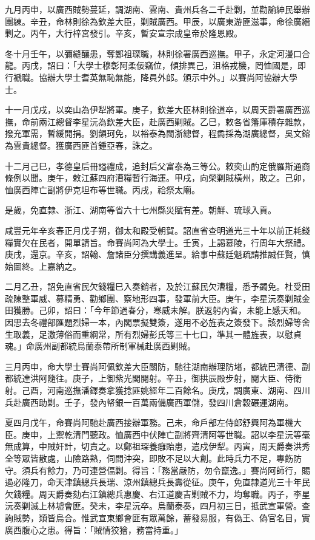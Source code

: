 \begin{pinyinscope}
九月丙申，以廣西賊勢蔓延，調湖南、雲南、貴州兵各二千赴剿，並勸諭紳民舉辦團練。辛丑，命林則徐為欽差大臣，剿賊廣西。甲辰，以廣東游匪滋事，命徐廣縉剿之。丙午，大行梓宮發引。辛亥，暫安宣宗成皇帝於隆恩殿。

冬十月壬午，以彌縫釀患，奪鄭祖琛職，林則徐署廣西巡撫。甲子，永定河漫口合龍。丙戌，詔曰：「大學士穆彰阿柔佞竊位，傾排異己，沮格戎機，罔恤國是，即行褫職。協辦大學士耆英無恥無能，降員外郎。頒示中外。」以賽尚阿協辦大學士。

十一月戊戌，以奕山為伊犁將軍。庚子，欽差大臣林則徐道卒，以周天爵署廣西巡撫，命前兩江總督李星沅為欽差大臣，赴廣西剿賊。乙巳，敕各省籓庫積存雜款，撥充軍需，暫緩開捐。劉韻珂免，以裕泰為閩浙總督，程矞採為湖廣總督，吳文鎔為雲貴總督。獲廣西匪首鍾亞春，誅之。

十二月己巳，孝德皇后冊謚禮成，追封后父富泰為三等公。敕奕山酌定俄羅斯通商條例以聞。庚午，敕江蘇四府漕糧暫行海運。甲戌，向榮剿賊橫州，敗之。己卯，恤廣西陣亡副將伊克坦布等世職。丙戌，祫祭太廟。

是歲，免直隸、浙江、湖南等省六十七州縣災賦有差。朝鮮、琉球入貢。

咸豐元年辛亥春正月戊子朔，御太和殿受朝賀。詔直省查明道光三十年以前正耗錢糧實欠在民者，開單請旨。命賽尚阿為大學士。壬寅，上謁慕陵，行周年大祭禮。庚戌，還京。辛亥，詔翰、詹諸臣分撰講義進呈。給事中蘇廷魁疏請推誠任賢，慎始圖終。上嘉納之。

二月乙丑，詔免直省民欠錢糧巳入奏銷者，及於江蘇民欠漕糧，悉予蠲免。杜受田疏陳整軍威、募精勇、勸鄉團、察地形四事，發軍前大臣。庚午，李星沅奏剿賊金田獲勝。己卯，詔曰：「今年節過春分，寒威未解。朕返躬內省，未能上感天和。因思去冬禮部匯題烈婦一本，內閣票擬雙簽，遂用不必旌表之簽發下。該烈婦等舍生取義，足激薄俗而重綱常，所有烈婦彭氏等三十七口，準其一體旌表，以慰貞魂。」命廣州副都統烏蘭泰帶所制軍械赴廣西剿賊。

三月丙申，命大學士賽尚阿佩欽差大臣關防，馳往湖南辦理防堵，都統巴清德、副都統達洪阿隨往。庚子，上御紫光閣閱射。辛丑，御拱辰殿步射，閱大臣、侍衛射。己酉，河南巡撫潘鐸奏拿獲捻匪姚經年二百餘名。庚戌，調廣東、湖南、四川兵赴廣西助剿。壬子，發內帑銀一百萬兩備廣西軍儲，發四川倉穀碾運湖南。

夏四月戊午，命賽尚阿馳赴廣西接辦軍務。己未，命戶部左侍郎舒興阿為軍機大臣。庚申，上禦乾清門聽政。恤廣西中伏陣亡副將齊清阿等世職。詔以李星沅等毫無成算，中賊奸計，切責之。以鄭祖琛養癰貽患，遣戍伊犁。丙寅，周天爵奏洪秀全等眾皆散處，山險路熟，伺間沖突，即敗不足以大創。此時兵力不足，專飭防守。須兵有餘力，乃可連營偪剿。得旨：「務當嚴防，勿令竄逸。」賽尚阿師行，賜遏必隆刀，命天津鎮總兵長瑞、涼州鎮總兵長壽從征。庚午，免直隸道光三十年民欠錢糧。周天爵奏劾右江鎮總兵惠慶、右江道慶吉剿賊不力，均奪職。丙子，李星沅奏剿滅上林墟會匪。癸未，李星沅卒。烏蘭泰奏，四月初三日，抵武宣軍營。查詢賊勢，類皆烏合。惟武宣東鄉會匪有眾萬餘，蓄發易服，有偽王、偽官名目，實廣西腹心之患。得旨：「賊情狡獪，務當持重。」


\end{pinyinscope}
